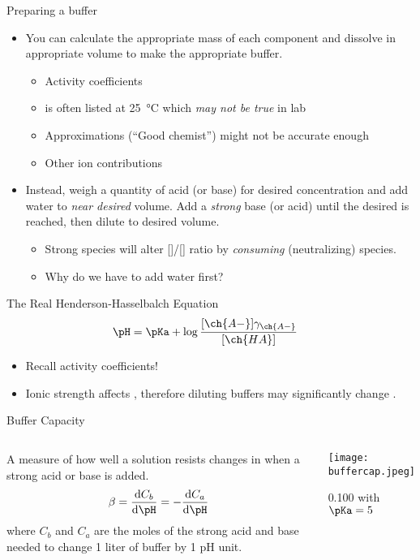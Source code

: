 \documentclass[11pt,letterpaper]{article}
\begin{document}
\begin{frame}{Preparing a buffer}
	\begin{itemize}[<+->]
		\item You can calculate the appropriate mass of each component
			and dissolve in appropriate volume to make the
			appropriate buffer.
			\begin{itemize}
				\item Activity coefficients
				\item \pKa is often listed at
					\SI{25}{\celsius} which \emph{may not
					be true} in lab
				\item Approximations (``Good chemist'') might
					not be accurate enough
				\item Other ion contributions
			\end{itemize}
		\item Instead, weigh a quantity of acid (or base) for desired
			concentration and add water to \emph{near desired}
			volume. Add a \emph{strong} base (or acid) until the
			desired \pH is reached, then dilute to desired volume.
			\begin{itemize}
				\item Strong species will alter
					[]/[] ratio by
					\emph{consuming} (neutralizing)
					species.
				\item Why do we have to add water first?
			\end{itemize}
	\end{itemize}
\end{frame}


\begin{frame}{The Real Henderson-Hasselbalch Equation}
	{\Large
	\begin{align*}
		\pH &= \pKa +
		\log\frac{[\ch{A-}]\gamma_{\ch{A-}}}{[\ch{HA}]}
	\end{align*}}

	\begin{itemize}
		\item Recall activity coefficients!
		\item Ionic strength affects \pH, therefore diluting buffers may
			significantly change \pH.
	\end{itemize}
\end{frame}

\begin{frame}{Buffer Capacity}
	\begin{columns}
		A measure of how well a solution resists changes in \pH{} when a
		strong acid or base is added.
		\begin{align*}
			\beta = \frac{\textrm{d}C_b}{\textrm{d}\pH} =
			-\frac{\textrm{d}C_a}{\textrm{d}\pH} 
		\end{align*}
		where $C_b$ and $C_a$ are the moles of the strong acid and base
		needed to change 1 liter of buffer by 1 pH unit.
		\begin{center}
			\texttt{[image: buffercap.jpeg]}
			
			\footnotesize
			\SI{0.100}{\formal}  with $\pKa = 5$
		\end{center}
	\end{columns}
\end{frame}
\end{document}
